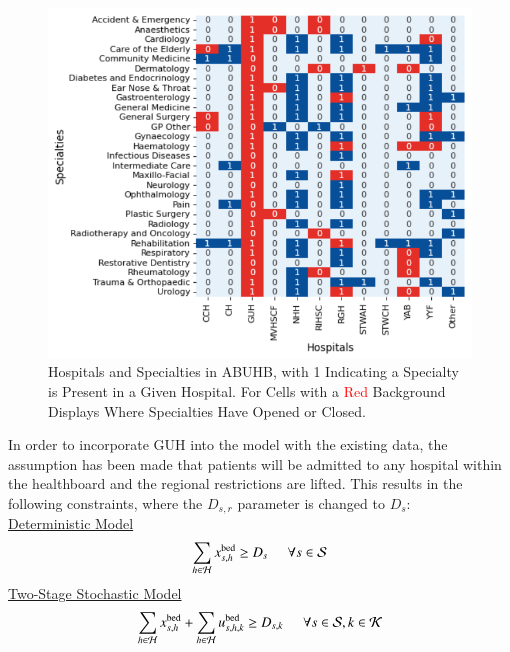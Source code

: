 \documentclass[../thesis.tex]{subfiles}
\begin{document}
\begin{figure}[h!]
    \centering
    \includegraphics[scale=0.7]{Chapters/Chapter6/Figures/UpdatedSpec.png}
    \caption{Hospitals and Specialties in ABUHB, with 1 Indicating a Specialty is Present in a Given Hospital. For Cells with a \textcolor{red}{Red} Background Displays Where Specialties Have Opened or Closed.}
    \label{fig:relocation}
\end{figure}

In order to incorporate GUH into the model with the existing data, the assumption has been made that patients will be admitted to any hospital within the healthboard and the regional restrictions are lifted. This results in the following constraints, where the $D_{s,r}$ parameter is changed to $D_{s}$:\\
\underline{Deterministic Model}
\begin{equation}
    \sum_{h\in\mathcal{H}} x^\textnormal{bed}_{s,h}\geq D_{s}  \hspace{0.5cm} \forall  s \in \mathcal{S}
\end{equation}
\underline{Two-Stage Stochastic Model}
\begin{equation}
    \sum_{h\in\mathcal{H}} x^\textnormal{bed}_{s,h} +  \sum_{h\in\mathcal{H}} u^\textnormal{bed}_{s,h,k} \geq D_{s,k} \hspace{0.5cm} \forall s \in \mathcal{S}, k \in \mathcal{K}\\
\end{equation}
\end{document}
